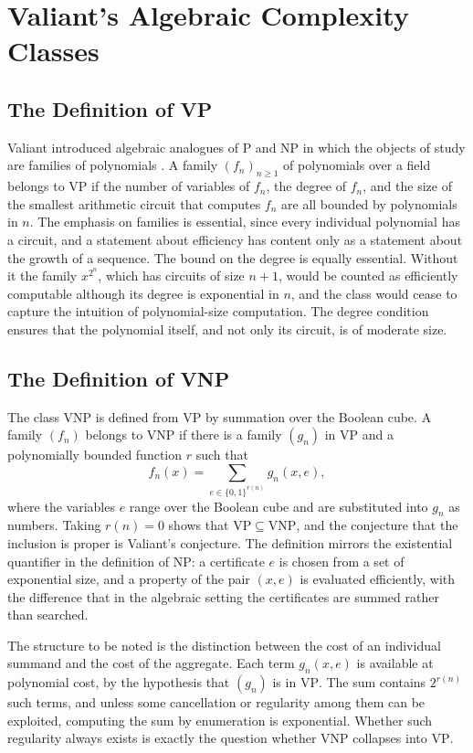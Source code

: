 \documentclass[11pt,letterpaper]{report}
\theoremstyle{plain}
\theoremstyle{definition}
\theoremstyle{remark}
\newcommand{\VP}{\mathrm{VP}}
\newcommand{\VNP}{\mathrm{VNP}}
\newcommand{\PTIME}{\mathrm{P}}
\newcommand{\NP}{\mathrm{NP}}
\begin{document}
\chapter{Valiant's Algebraic Complexity Classes}

\section{The Definition of VP}

Valiant introduced algebraic analogues of $\PTIME$ and $\NP$ in which the objects of study are families of polynomials \cite{Valiant1979}. A family $(f_n)_{n\ge1}$ of polynomials over a field belongs to $\VP$ if the number of variables of $f_n$, the degree of $f_n$, and the size of the smallest arithmetic circuit that computes $f_n$ are all bounded by polynomials in $n$. The emphasis on families is essential, since every individual polynomial has a circuit, and a statement about efficiency has content only as a statement about the growth of a sequence. The bound on the degree is equally essential. Without it the family $x^{2^n}$, which has circuits of size $n+1$, would be counted as efficiently computable although its degree is exponential in $n$, and the class would cease to capture the intuition of polynomial-size computation. The degree condition ensures that the polynomial itself, and not only its circuit, is of moderate size.

\section{The Definition of VNP}

The class $\VNP$ is defined from $\VP$ by summation over the Boolean cube. A family $(f_n)$ belongs to $\VNP$ if there is a family $(g_n)$ in $\VP$ and a polynomially bounded function $r$ such that
\[
f_n(x)=
\sum_{e\in\{0,1\}^{r(n)}}g_n(x,e),
\]
where the variables $e$ range over the Boolean cube and are substituted into $g_n$ as numbers. Taking $r(n)=0$ shows that $\VP\subseteq\VNP$, and the conjecture that the inclusion is proper is Valiant's conjecture. The definition mirrors the existential quantifier in the definition of $\NP$: a certificate $e$ is chosen from a set of exponential size, and a property of the pair $(x,e)$ is evaluated efficiently, with the difference that in the algebraic setting the certificates are summed rather than searched.

The structure to be noted is the distinction between the cost of an individual summand and the cost of the aggregate. Each term $g_n(x,e)$ is available at polynomial cost, by the hypothesis that $(g_n)$ is in $\VP$. The sum contains $2^{r(n)}$ such terms, and unless some cancellation or regularity among them can be exploited, computing the sum by enumeration is exponential. Whether such regularity always exists is exactly the question whether $\VNP$ collapses into $\VP$.
\end{document}
